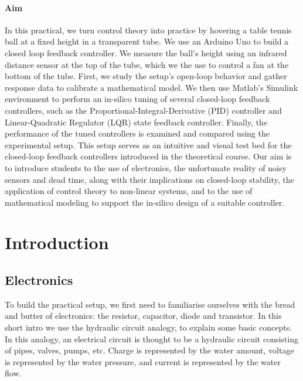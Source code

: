 \documentclass[10pt,twoside,openright]{article}
\begin{document}
\paragraph{Aim} In this practical, we turn control theory into practice by hovering a table tennis ball at a fixed height in a transparent tube. We use an Arduino Uno to build a closed loop feedback controller. We measure the ball's height using an infrared distance sensor at the top of the tube, which we the use to control a fan at the bottom of the tube. First, we study the setup's open-loop behavior and gather response data to calibrate a mathematical model. We then use Matlab's Simulink environment to perform an in-silico tuning of several closed-loop feedback controllers, such as the Proportional-Integral-Derivative (PID) controller and Linear-Quadratic Regulator (LQR) state feedback controller. Finally, the performance of the tuned controllers is examined and compared using the experimental setup. This setup serves as an intuitive and visual test bed for the closed-loop feedback controllers introduced in the theoretical course. Our aim is to introduce students to the use of electronics, the unfortunate reality of noisy sensors and dead time, along with their implications on closed-loop stability, the application of control theory to non-linear systems, and to the use of mathematical modeling to support the in-silico design of a suitable controller.


\setcounter{tocdepth}{2}
\tableofcontents

\clearpage
\section{Introduction}

\subsection{Electronics}

To build the practical setup, we first need to familiarise ourselves with the bread and butter of electronics: the resistor, capacitor, diode and transistor. In this short intro we use the hydraulic circuit analogy, to explain some basic concepts. In this analogy, an electrical circuit is thought to be a hydraulic circuit consisting of pipes, valves, pumps, etc. Charge is represented by the water amount, voltage is represented by the water pressure, and current is represented by the water flow.
\end{document}
